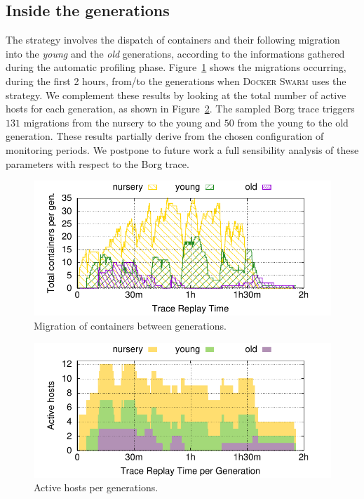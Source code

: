 \subsection{Inside the \GP generations}
\label{subsec:eval:inside}

The \GP strategy involves the dispatch of containers and their following migration into the \emph{young} and the \emph{old} generations, according to the informations gathered during the automatic profiling phase.
Figure~\ref{fig:inside} shows the migrations occurring, during the first 2 hours, from/to the generations when \textsc{Docker Swarm} uses the \GP strategy.
We complement these results by looking at the total number of active hosts for each generation, as shown in Figure~\ref{fig:inside:generation}.
The sampled Borg trace triggers $131$ migrations from the nursery to the young and $50$ from the young to the old generation.
These results partially derive from the chosen configuration of monitoring periods.
We postpone to future work a full sensibility analysis of these parameters with respect to the Borg trace.

\begin{figure}[t!]
  \centering
  \includegraphics[]{Figures/plots/containers/containers}
  \caption{Migration of containers between generations.}
  \label{fig:inside}
\end{figure}

\begin{figure}[t!]
  \centering
  \includegraphics[]{Figures/plots/containers/generation_hosts}
  \caption{Active hosts per generations.}
  \label{fig:inside:generation}
\end{figure}

